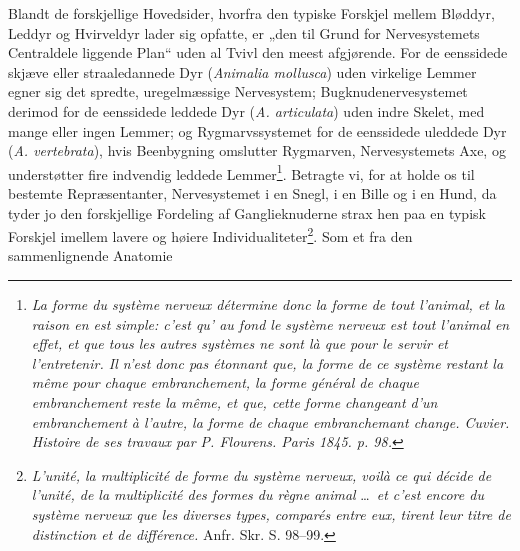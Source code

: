 \documentclass[12pt,a4paper]{book}
\begin{document}
Blandt de forskjellige Hovedsider, hvorfra den typiske Forskjel mellem Bløddyr,
Leddyr og Hvirveldyr lader sig opfatte, er „den til Grund for Nervesystemets
Centraldele liggende Plan“ uden al Tvivl den meest afgjørende. For de eenssidede
skjæve eller straaledannede Dyr (\textit{Animalia mollusca}) uden virkelige
Lemmer egner sig det spredte, uregelmæssige Nervesystem; Bugknudenervesystemet
derimod for de eenssidede leddede Dyr (\textit{A. articulata}) uden indre
Skelet, med mange eller ingen Lemmer; og Rygmarvssystemet for de eenssidede
uleddede Dyr (\textit{A. vertebrata}), hvis Beenbygning omslutter Rygmarven,
Nervesystemets Axe, og understøtter fire indvendig leddede
Lemmer\footnote{\textit{La forme du système nerveux détermine donc la forme de
tout l'animal, et la raison en est simple: c'est qu' au fond le système nerveux
est tout l'animal en effet, et que tous les autres systèmes ne sont là que pour
le servir et l'entretenir. Il n'est donc pas étonnant que, la forme de ce
système restant la même pour chaque \emph{embranchement}, la forme général de
chaque \emph{embranchement} reste la même, et que, cette forme changeant d'un
\emph{embranchement} à l'autre, la forme de chaque \emph{embranchemant} change.
\emph{Cuvier}. Histoire de ses travaux par P. Flourens. Paris 1845. p. 98.}}.
\setcounter{footnote}{0}
Betragte vi, for at holde os til bestemte Repræsentanter, Nervesystemet i en
Snegl, i en Bille og i en Hund, da tyder jo den forskjellige Fordeling af
Ganglieknuderne strax hen paa en typisk Forskjel imellem lavere og høiere
Individualiteter\footnote{\textit{\emph{L'unité, la multiplicité} de forme du
système nerveux, voilà ce qui décide de \emph{l'unité, de la multiplicité} des
formes du règne animal} \dots\ \textit{et c'est encore du système nerveux que
les diverses types, comparés entre eux, tirent leur titre de distinction et de
différence.} Anfr. Skr. S. 98--99.}. Som et fra den sammenlignende Anatomie
\end{document}
